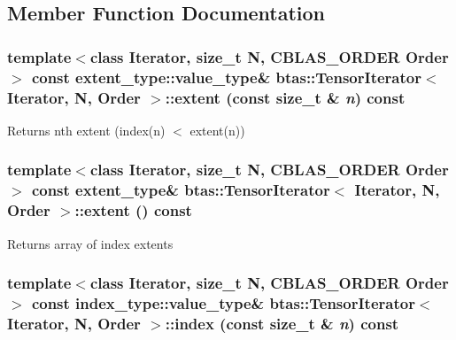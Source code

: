 \subsection{Member Function Documentation}
\hypertarget{classbtas_1_1_tensor_iterator_a45594305ef32669f649eec878fd3d5fb}{
\subsubsection[{extent}]{\setlength{\rightskip}{0pt plus 5cm}template$<$class Iterator, size\_\-t N, CBLAS\_\-ORDER Order$>$ const extent\_\-type::value\_\-type\& {\bf btas::TensorIterator}$<$ Iterator, N, Order $>$::extent (const size\_\-t \& {\em n}) const}}
\label{classbtas_1_1_tensor_iterator_a45594305ef32669f649eec878fd3d5fb}
\begin{DoxyReturn}{Returns}
nth extent (index(n) $<$ extent(n)) 
\end{DoxyReturn}
\hypertarget{classbtas_1_1_tensor_iterator_a0a09a0bc84f22980d6cc945afeea9330}{
\subsubsection[{extent}]{\setlength{\rightskip}{0pt plus 5cm}template$<$class Iterator, size\_\-t N, CBLAS\_\-ORDER Order$>$ const extent\_\-type\& {\bf btas::TensorIterator}$<$ Iterator, N, Order $>$::extent () const}}
\label{classbtas_1_1_tensor_iterator_a0a09a0bc84f22980d6cc945afeea9330}
\begin{DoxyReturn}{Returns}
array of index extents 
\end{DoxyReturn}
\hypertarget{classbtas_1_1_tensor_iterator_a095c6060b59b45cb7ff6f85fd240948b}{
\subsubsection[{index}]{\setlength{\rightskip}{0pt plus 5cm}template$<$class Iterator, size\_\-t N, CBLAS\_\-ORDER Order$>$ const index\_\-type::value\_\-type\& {\bf btas::TensorIterator}$<$ Iterator, N, Order $>$::index (const size\_\-t \& {\em n}) const}}
